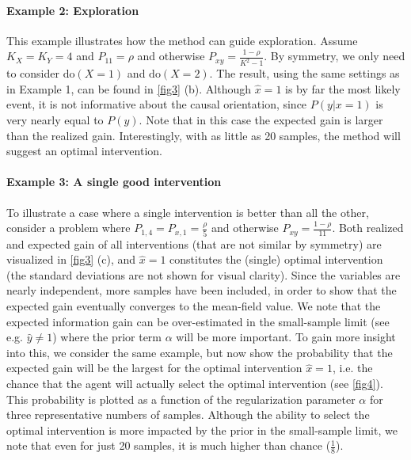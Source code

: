 \documentclass[letterpaper]{article} %
\newcommand{\doo}{\textrm{do}}
\begin{document}
\paragraph{Example 2: Exploration}
This example illustrates how the method can guide exploration. Assume $K_X = K_Y = 4$ and $P_{11} = \rho$ and otherwise $P_{xy} = \frac{1-\rho}{ K^2-1}$. By symmetry, we only need to consider $\doo(X=1)$ and $\doo(X=2)$. The result, using the same settings as in Example 1, can be found in \cref{fig3} (b). Although $\hat x =1$ is by far the most likely event, it is not informative about the causal orientation, since $P(y|x=1)$ is very nearly equal to $P(y)$. Note that in this case the expected gain is larger than the realized gain. Interestingly, with as little as 20 samples, the method will suggest an optimal intervention.


\paragraph{Example 3: A single good intervention}
To illustrate a case where a single intervention is better than all the other, consider a problem where $P_{1,4} = P_{x,1} = \frac{\rho}{5}$ and otherwise $P_{xy} = \frac{1-\rho}{11}$. Both realized and expected gain of all interventions (that are not similar by symmetry) are visualized in \cref{fig3} (c), and $\hat x = 1$ constitutes the (single) optimal intervention (the standard deviations are not shown for visual clarity). %
Since the variables are nearly independent, more samples have been included, in order to show that the expected  gain eventually converges to the mean-field value.  We note that the expected information gain can be over-estimated in the small-sample limit (see e.g. $\hat y \neq 1$) where the prior term $\alpha$ will be more important.
To gain more insight into this, we consider the same example, but now show the probability that the expected gain will be the largest for the optimal intervention $\hat x=1$, i.e. the chance that the agent will actually select the optimal intervention (see  \cref{fig4}). This probability is plotted as a function of the regularization parameter $\alpha$ for three representative numbers of samples. Although the ability to select the optimal intervention is more impacted by the prior in the small-sample limit, we note that even for just 20 samples, it is much higher than chance ($\frac{1}{8}$).
\end{document}
